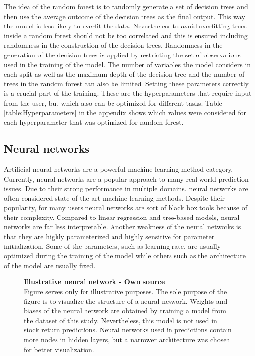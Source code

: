\documentclass[12pt]{article}
\begin{document}
The idea of the random forest is to randomly generate a set of decision trees and then use the average outcome of the decision trees as the final output. This way the model is less likely to overfit the data. Nevertheless to avoid overfitting trees inside a random forest should not be too correlated and this is ensured including randomness in the construction of the decision trees. Randomness in the generation of the decision trees is applied by restricting the set of observations used in the training of the model. The number of variables the model considers in each split as well as the maximum depth of the decision tree and the number of trees in the random forest can also be limited. Setting these parameters correctly is a crucial part of the training. These are the hyperparameters that require input from the user, but which also can be optimized for different tasks. Table \ref{table:Hyperparameters} in the appendix shows which values were considered for each hyperparameter that was optimized for random forest. \par

\subsection{Neural networks}

Artificial neural networks are a powerful machine learning method category. Currently, neural networks are a popular approach to many real-world prediction issues. Due to their strong performance in multiple domains, neural networks are often considered state-of-the-art machine learning methods. Despite their popularity, for many users neural networks are sort of black box tools because of their complexity. Compared to linear regression and tree-based models, neural networks are far less interpretable. Another weakness of the neural networks is that they are highly parameterized and highly sensitive for parameter initialization. Some of the parameters, such as learning rate, are usually optimized during the training of the model while others such as the architecture of the model are usually fixed.  \par

\begin{figure}[ht]
\centering
\caption[Illustrative neural network]{\textbf{Illustrative neural network \textnormal{- Own source}}\\  Figure serves only for illustrative purposes. The sole purpose of the figure is to visualize the structure of a neural network. Weights and biases of the neural network are obtained by training a model from the dataset of this study. Nevertheless, this model is not used in stock return predictions. Neural networks used in predictions contain more nodes in hidden layers, but a narrower architecture was chosen for better visualization.}

\label{plot:NN}
\end{figure}
\end{document}
